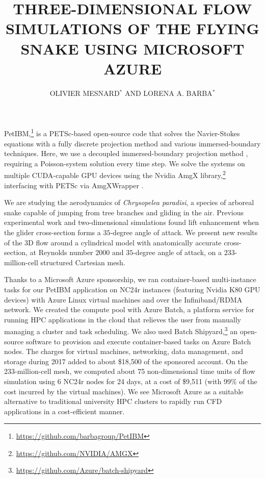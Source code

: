 \documentclass{parcfd2018}
\title{THREE-DIMENSIONAL FLOW SIMULATIONS OF THE FLYING SNAKE USING MICROSOFT AZURE}
\author{OLIVIER MESNARD$^{*}$ AND LORENA A. BARBA$^{*}$}
\begin{document}

PetIBM,\footnote{\url{https://github.com/barbagroup/PetIBM}} is a PETSc-based open-source code that solves the Navier-Stokes equations with a fully discrete projection method and various immersed-boundary techniques.
Here, we use a decoupled immersed-boundary projection method \cite{Li_et_al_2016}, requiring a Poisson-system solution every time step.
We solve the systems on multiple CUDA-capable GPU devices using the Nvidia AmgX library,\footnote{\url{https://github.com/NVIDIA/AMGX}} interfacing with PETSc via AmgXWrapper \cite{AmgXWrapper}.

We are studying the aerodynamics of \textit{Chrysopelea paradisi}, a species of arboreal snake capable of jumping from tree branches and gliding in the air.
Previous experimental work \cite{Holden_et_al_2014} and two-dimensional simulations \cite{Krishnan_et_al_2014, Mesnard_Barba_2017} found lift enhancement when the glider cross-section forms a $35$-degree angle of attack.
We present new results of the 3D flow around a cylindrical model with anatomically accurate cross-section, at Reynolds number $2000$ and $35$-degree angle of attack, on a  $233$-million-cell structured Cartesian mesh.

Thanks to a Microsoft Azure sponsorship, we ran container-based multi-instance tasks for our PetIBM application on NC24r instances (featuring Nvidia K80 GPU devices) with Azure Linux virtual machines and over the Infiniband/RDMA network.
We created the compute pool with Azure Batch, a platform service for running HPC applications in the cloud that relieves the user from manually managing a cluster and task scheduling.
We also used Batch Shipyard,\footnote{\url{https://github.com/Azure/batch-shipyard}} an open-source software to provision and execute container-based tasks on Azure Batch nodes.
The charges for virtual machines, networking, data management, and storage during 2017 added to about \$18,500 of the sponsored account.
On the 233-million-cell mesh, we computed about 75 non-dimensional time units of flow simulation using 6 NC24r nodes for 24 days, at a cost of \$9,511 (with 99\% of the cost incurred by the virtual machines).
We see Microsoft Azure as a suitable alternative to traditional university HPC clusters to rapidly run CFD applications in a cost-efficient manner.
\end{document}
